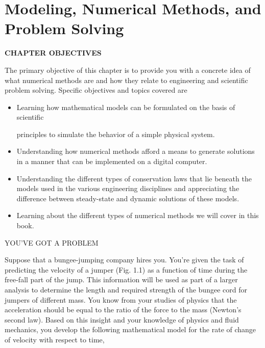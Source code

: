 \documentclass[../main.tex]{subfiles}
\begin{document}
\chapter{Modeling, Numerical Methods, and Problem Solving}
\label{cha:cha3}


\begin{center}
\Large{\textbf{CHAPTER OBJECTIVES}}
\end{center}

\normalsize{The primary objective of this chapter is to provide you with a concrete idea of what
numerical methods are and how they relate to engineering and scientific problem
solving. Specific objectives and topics covered are}

\begin{itemize}

\item Learning how mathematical models can be formulated on the basis of scientific

principles to simulate the behavior of a simple physical system.
\item Understanding how numerical methods afford a means to generate solutions in a
manner that can be implemented on a digital computer.

\item Understanding the different types of conservation laws that lie beneath the models
used in the various engineering disciplines and appreciating the difference
between steady-state and dynamic solutions of these models.

\item Learning about the different types of numerical methods we will cover in this
book.

\end{itemize}
\Large{YOU'VE GOT A PROBLEM}


\normalsize{Suppose that a bungee-jumping company hires you. You’re given the task of predicting the velocity of a jumper (Fig. 1.1)  as a function of time during the free-fall part
of the jump. This information will be used as part of a larger analysis to determine the
length and required strength of the bungee cord for jumpers of different mass.
You know from your studies of physics that the acceleration should be equal to the ratio
of the force to the mass (Newton’s second law). Based on this insight and your knowledge of physics and fluid mechanics, you develop the following mathematical model for the rate
of change of velocity with respect to time, }
\newpage
\end{document}
